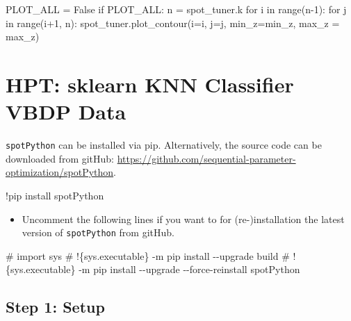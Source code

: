 \documentclass[
  letterpaper,
  DIV=11,
  numbers=noendperiod]{scrreprt}
\newenvironment{Shaded}{\begin{snugshade}}{\end{snugshade}}
\newcommand{\BuiltInTok}[1]{\textcolor[rgb]{0.00,0.23,0.31}{#1}}
\newcommand{\CommentTok}[1]{\textcolor[rgb]{0.37,0.37,0.37}{#1}}
\newcommand{\ControlFlowTok}[1]{\textcolor[rgb]{0.00,0.23,0.31}{#1}}
\newcommand{\DecValTok}[1]{\textcolor[rgb]{0.68,0.00,0.00}{#1}}
\newcommand{\KeywordTok}[1]{\textcolor[rgb]{0.00,0.23,0.31}{#1}}
\newcommand{\NormalTok}[1]{\textcolor[rgb]{0.00,0.23,0.31}{#1}}
\newcommand{\OperatorTok}[1]{\textcolor[rgb]{0.37,0.37,0.37}{#1}}
\newcommand{\VariableTok}[1]{\textcolor[rgb]{0.07,0.07,0.07}{#1}}
\providecommand{\tightlist}{%
  \setlength{\itemsep}{0pt}\setlength{\parskip}{0pt}}\usepackage{longtable,booktabs,array}
\begin{document}
\begin{Shaded}
\begin{Highlighting}[]
\NormalTok{PLOT\_ALL }\OperatorTok{=} \VariableTok{False}
\ControlFlowTok{if}\NormalTok{ PLOT\_ALL:}
\NormalTok{    n }\OperatorTok{=}\NormalTok{ spot\_tuner.k}
    \ControlFlowTok{for}\NormalTok{ i }\KeywordTok{in} \BuiltInTok{range}\NormalTok{(n}\OperatorTok{{-}}\DecValTok{1}\NormalTok{):}
        \ControlFlowTok{for}\NormalTok{ j }\KeywordTok{in} \BuiltInTok{range}\NormalTok{(i}\OperatorTok{+}\DecValTok{1}\NormalTok{, n):}
\NormalTok{            spot\_tuner.plot\_contour(i}\OperatorTok{=}\NormalTok{i, j}\OperatorTok{=}\NormalTok{j, min\_z}\OperatorTok{=}\NormalTok{min\_z, max\_z }\OperatorTok{=}\NormalTok{ max\_z)}
\end{Highlighting}
\end{Shaded}

\hypertarget{sec-hpt-sklearn-knn-classifier-vbdp-data}{%
\chapter{HPT: sklearn KNN Classifier VBDP
Data}\label{sec-hpt-sklearn-knn-classifier-vbdp-data}}

\texttt{spotPython} can be installed via pip. Alternatively, the source
code can be downloaded from gitHub:
\url{https://github.com/sequential-parameter-optimization/spotPython}.

\begin{Shaded}
\begin{Highlighting}[]
\NormalTok{!pip install spotPython}
\end{Highlighting}
\end{Shaded}

\begin{itemize}
\tightlist
\item
  Uncomment the following lines if you want to for (re-)installation the
  latest version of \texttt{spotPython} from gitHub.
\end{itemize}

\begin{Shaded}
\begin{Highlighting}[]
\CommentTok{\# import sys}
\CommentTok{\# !\{sys.executable\} {-}m pip install {-}{-}upgrade build}
\CommentTok{\# !\{sys.executable\} {-}m pip install {-}{-}upgrade {-}{-}force{-}reinstall spotPython}
\end{Highlighting}
\end{Shaded}

\hypertarget{sec-setup-19}{%
\section{Step 1: Setup}\label{sec-setup-19}}
\end{document}
